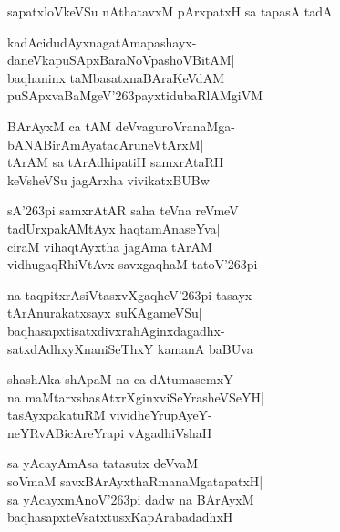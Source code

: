 \documentclass[twoside,12pt,openright]{book}
\def\S{\char'263}
\newcounter{shloka}[chapter]
\begin{document}
\begin{shloka}%
sapatxloVkeVSu nAthatavxM pArxpatxH sa tapasA tadA
\end{shloka}

\begin{shloka}%
kadAcidudAyxnagatAmapashayx-\\
daneVkapuSApxBaraNoVpashoVBitAM|\\
baqhaninx taMbasatxnaBAraKeVdAM\\
puSApxvaBaMgeV\S payxtidubaRlAMgiVM
\end{shloka}

\begin{shloka}%
BArAyxM ca tAM deVvaguroVranaMga-\\
bANABirAmAyatacAruneVtArxM|\\
tArAM sa tArAdhipatiH samxrAtaRH\\
keVsheVSu jagArxha vivikatxBUBw
\end{shloka}

\begin{shloka}%
sA\S pi samxrAtAR saha teVna reVmeV\\
tadUrxpakAMtAyx haqtamAnaseYva|\\
ciraM vihaqtAyxtha jagAma tArAM\\
vidhugaqRhiVtAvx savxgaqhaM tatoV\S pi
\end{shloka}

\begin{shloka}%
na taqpitxrAsiVtasxvXgaqheV\S pi tasayx\\
tArAnurakatxsayx suKAgameVSu|\\
baqhasapxtisatxdivxrahAginxdagadhx-\\
satxdAdhxyXnaniSeThxY kamanA baBUva
\end{shloka}

\begin{shloka}%
shashAka shApaM na ca dAtumasemxY\\
na maMtarxshasAtxrXginxviSeYrasheVSeYH|\\
tasAyxpakatuRM vividheYrupAyeY-\\
neYRvABicAreYrapi vAgadhiVshaH
\end{shloka}

\begin{shloka}%
sa yAcayAmAsa tatasutx deVvaM\\
soVmaM savxBArAyxthaRmanaMgatapatxH|\\
sa yAcayxmAnoV\S pi dadw na BArAyxM\\
baqhasapxteVsatxtusxKapArabadadhxH
\end{shloka}
\end{document}
